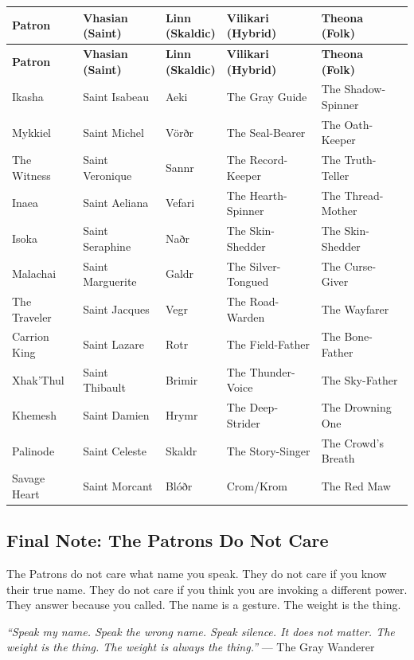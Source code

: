 {\small
\setlength{\tabcolsep}{4pt}
\begin{longtable}{p{2.2cm}p{2.2cm}p{2.2cm}p{2.4cm}p{2.4cm}}
\toprule
\textbf{Patron} & 
\shortstack{\textbf{Vhasian}\\\textbf{(Saint)}} & 
\shortstack{\textbf{Linn}\\\textbf{(Skaldic)}} & 
\shortstack{\textbf{Vilikari}\\\textbf{(Hybrid)}} & 
\shortstack{\textbf{Theona}\\\textbf{(Folk)}} \\
\midrule
\endfirsthead
\toprule
\textbf{Patron} & 
\shortstack{\textbf{Vhasian}\\\textbf{(Saint)}} & 
\shortstack{\textbf{Linn}\\\textbf{(Skaldic)}} & 
\shortstack{\textbf{Vilikari}\\\textbf{(Hybrid)}} & 
\shortstack{\textbf{Theona}\\\textbf{(Folk)}} \\
\midrule
\endhead
\bottomrule
\endfoot
Ikasha & Saint Isabeau & Aeki & The Gray Guide & The Shadow-Spinner \\
Mykkiel & Saint Michel & V\"{o}rðr & The Seal-Bearer & The Oath-Keeper \\
The Witness & Saint Veronique & Sannr & The Record-Keeper & The Truth-Teller \\
Inaea & Saint Aeliana & Vefari & The Hearth-Spinner & The Thread-Mother \\
Isoka & Saint Seraphine & Naðr & The Skin-Shedder & The Skin-Shedder \\
Malachai & Saint Marguerite & Galdr & The Silver-Tongued & The Curse-Giver \\
The Traveler & Saint Jacques & Vegr & The Road-Warden & The Wayfarer \\
Carrion King & Saint Lazare & Rotr & The Field-Father & The Bone-Father \\
Xhak'Thul & Saint Thibault & Brimir & The Thunder-Voice & The Sky-Father \\
Khemesh & Saint Damien & Hrymr & The Deep-Strider & The Drowning One \\
Palinode & Saint Celeste & Skaldr & The Story-Singer & The Crowd's Breath \\
Savage Heart & Saint Morcant & Blóðr & Crom/Krom & The Red Maw \\
\bottomrule
\end{longtable}
}


\subsection{Final Note: The Patrons Do Not Care}

The Patrons do not care what name you speak. They do not care if you know their true name. They do not care if you think you are invoking a different power. They answer because you called. The name is a gesture. The weight is the thing.

\textit{``Speak my name. Speak the wrong name. Speak silence. It does not matter. The weight is the thing. The weight is always the thing.''}
--- The Gray Wanderer